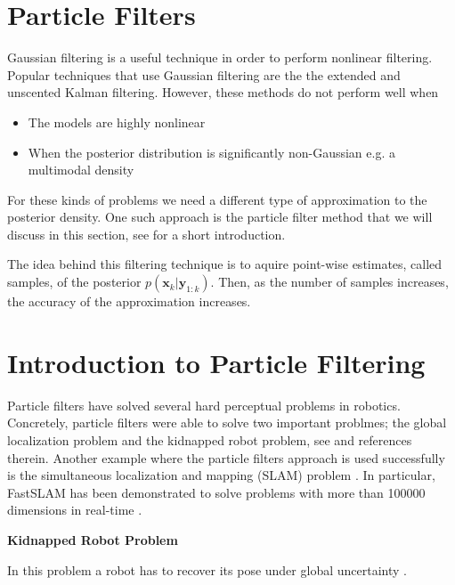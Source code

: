 \section{Particle Filters}
\label{particle_filters}

Gaussian filtering is a useful technique in order to perform nonlinear filtering. Popular techniques that 
use Gaussian filtering are the   the extended and unscented Kalman filtering. However, these methods do not perform well when

\begin{itemize}
\item The models are highly nonlinear
\item When the posterior distribution is significantly non-Gaussian e.g. a multimodal density
\end{itemize}


For these kinds of problems we need a different type of approximation to the posterior density. One such approach is the particle filter
method that we will discuss in this section, see \cite{Thurn2002} for a short introduction. 


The idea behind this filtering technique is  to aquire point-wise
estimates, called samples, of the posterior $p(\mathbf{x}_k | \mathbf{y}_{1:k})$. Then, as the number of samples increases,
the accuracy of the approximation increases. 

\section{Introduction to Particle Filtering }
\label{particle_filter_introduction}

Particle filters have solved several hard perceptual problems in robotics. Concretely, particle filters were able to solve
two important problmes; the global localization problem and the kidnapped robot problem, see \cite{Thurn2002} and references therein.
Another example where the particle filters approach is used successfully is the simultaneous localization and mapping (SLAM) problem \cite{Thurn2002}.
In particular, FastSLAM has been demonstrated to solve problems with more than 100000 dimensions in real-time \cite{Thurn2002}. 

\begin{framed}
\begin{remark}{\textbf{Kidnapped Robot Problem}}

In this problem a robot has to recover its pose under global uncertainty \cite{Thurn2002}.
\end{remark}
\end{framed}

